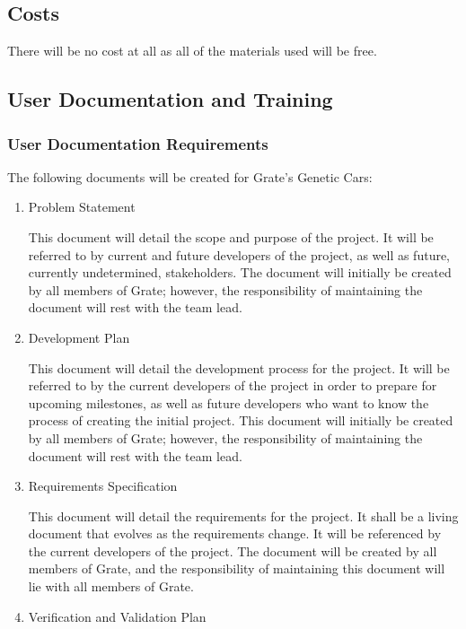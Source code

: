 \documentclass[12pt, titlepage]{article}
\begin{document}
\subsection{Costs}
There will be no cost at all as all of the materials used will be free.

\subsection{User Documentation and Training}

\subsubsection{User Documentation Requirements}
The following documents will be created for Grate's Genetic Cars:

\begin{enumerate}

\item{Problem Statement}

This document will detail the scope and purpose of the project. It will be referred to by current and future developers of the project, as well as future, currently undetermined, stakeholders. The document will initially be created by all members of Grate; however, the responsibility of maintaining the document will rest with the team lead.

\item{Development Plan}

This document will detail the development process for the project. It will be referred to by the current developers of the project in order to prepare for upcoming milestones, as well as future developers who want to know the process of creating the initial project. This document will initially be created by all members of Grate; however, the responsibility of maintaining the document will rest with the team lead.

\item{Requirements Specification}

This document will detail the requirements for the project. It shall be a living document that evolves as the requirements change. It will be referenced by the current developers of the project. The document will be created by all members of Grate, and the responsibility of maintaining this document will lie with all members of Grate. 

\item{Verification and Validation Plan}


\end{enumerate}
\end{document}
